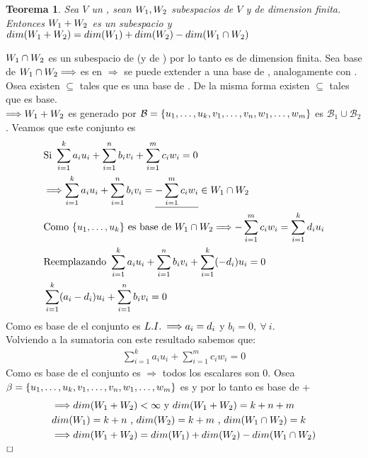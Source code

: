 \documentclass[]{article}
\newtheorem{theorem}{Teorema}
\newenvironment{proof}{\noindent{\bf Prueba:}}{$\hfill \Box$ \vspace{10pt}}
\newcommand{\ida}{\Longrightarrow}
\newcommand{\base}{\text{$\mathcal{B}$}}
\begin{document}
\begin{theorem}
    Sea $V$ un \espvec , sean $\text{$W_{1}$},\text{$W_{2}$}$ subespacios de $V$ y de dimension finita.\\
    Entonces $\text{$W_{1}$}+\text{$W_{2}$}$ es un subespacio y $dim(\text{$W_{1}$}+\text{$W_{2}$}) = dim(\text{$W_{1}$}) + dim(\text{$W_{2}$}) - dim(\text{$W_{1}$} \cap \text{$W_{2}$})$
\end{theorem}
\begin{proof}
    $\text{$W_{1}$}\cap\text{$W_{2}$}$ es un subespacio de  (y de ) por lo tanto es de dimension finita.
    Sea  base de $\W{1} \cap \W{2} \ida$  es \li en 
    $\ida$ se puede extender a una base de , analogamente con .\\
    Osea existen  $\subseteq$  tales que 
    es una base de . De la misma forma existen  $\subseteq$  tales que
     es base.\\
    $\ida \W{1}+\W{2}$ es generado por $\base= \conjunto{u_1,\dots,u_k,v_1,\dots,v_n,w_1,\dots,w_m}$
    es $\base_1 \cup \base_2$. Veamos que este conjunto es \li
    \begin{align*}
        &\text{Si } \sum_{i=1}^{k} a_i u_i + \sum_{i=1}^{n} b_i v_i + \sum_{i=1}^{m} c_i w_i = 0\\
        &\ida \sum_{i=1}^{k} a_i u_i + \sum_{i=1}^{n} b_i v_i = \underline{- \sum_{i=1}^{m} c_i w_i} \in \W{1}\cap\W{2}\\
        &\text{Como \conjunto{u_1,\dots,u_k} es base de } \W{1}\cap\W{2} \ida - \sum_{i=1}^{m} c_i w_i = \sum_{i=1}^{k} d_iu_i\\
        &\text{Reemplazando } \sum_{i=1}^{k} a_i u_i + \sum_{i=1}^{n} b_i v_i + \sum_{i=1}^{k} (-d_i)u_i = 0\\
        &\sum_{i=1}^{k} (a_i-d_i)u_i + \sum_{i=1}^{n} b_i v_i = 0
    \end{align*}
    Como  es base de  el conjunto es $\li\ida a_i=d_i$ y $b_i=0 ,\:\forall\: i$.\\
    Volviendo a la sumatoria con este resultado sabemos que:
    \begin{align*}
        \sum_{i=1}^{k} a_i u_i + \sum_{i=1}^{m} c_i w_i = 0
    \end{align*}
    Como  es base de  el conjunto es \li $\ida$ todos los escalares son 0.
    Osea $\beta = \text{$\{ {u_1,\dots,u_k,v_1,\dots,v_n,w_1,\dots,w_m} \}$}$ es \li y por lo tanto es base de +
    \begin{align*}
        &\ida dim(\W{1}+\W{2})<\infty \text{ y } dim(\W{1}+\W{2})=k+n+m\\
        &dim(\W{1})=k+n \text{ , } dim(\W{2})=k+m \text{ , } dim(\W{1}\cap\W{2})=k\\
        &\ida dim(\W{1}+\W{2}) = dim(\W{1})+dim(\W{2})-dim(\W{1}\cap\W{2})
    \end{align*}
\end{proof}
\end{document}
